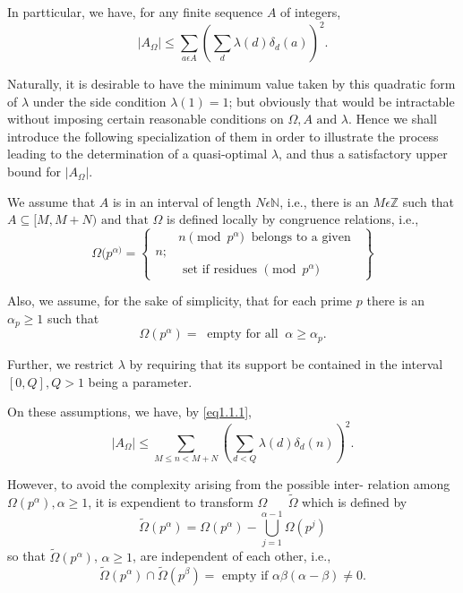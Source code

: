 In partticular, we have, for any finite sequence $A$ of integers,
\begin{equation*}
\mid A_{\Omega}\mid \leq \sum_{a \epsilon  A} \left(\sum_{d} \lambda(d)
\delta_{d} (a)\right)^{2}.\tag{1.1.1}\label{eq1.1.1} 
\end{equation*}

Naturally, it  is desirable to have the minimum value taken by this
quadratic form of $\lambda$ under the side condition $\lambda(1) = 1$;
but obviously that would be intractable without imposing certain
reasonable conditions on $\Omega, A \text{ and } \lambda$. Hence we
shall introduce the following specialization of them in order to
illustrate the process leading to the determination of a quasi-optimal
$\lambda$, and thus a satisfactory upper bound for $|A_{\Omega} |$. 

We assume that $A$ is in an interval of length $N \epsilon
\mathbb{N}$, i.e., there is an $M \epsilon \mathbb{Z}$  such that
$A \subseteq [M, M + N) \text{ and that } \Omega$ is defined locally
by congruence relations, i.e., 
\begin{equation*}
  \Omega(p^{\alpha)} =
  \left\{
  \begin{aligned}
    & n \pmod {p^\alpha} ~\text{ belongs to a given }~ \\
    n; & \\
    & \text{ set if residues } \pmod {p^\alpha} 
  \end{aligned}
  \right\}\tag{1.1.2}\label{eq1.1.2}
\end{equation*}\pageoriginale

Also, we assume, for the sake of simplicity, that for each prime $p$
there is an $\alpha_{p} \geq 1$ such that 
\begin{equation*}
\Omega(p^{\alpha}) = ~\text{ empty for all }~ \alpha \geq
\alpha_{p}.\tag{1.1.3}\label{eq1.1.3} 
\end{equation*}

Further, we restrict $\lambda$ by requiring that its support be
contained in the interval $[0, Q], Q > 1$ being a parameter. 

On these assumptions, we have, by \eqref{eq1.1.1}, 
\begin{equation*}
  | A_{\Omega} | \leq \sum_{M \leq n < M+N} \left(\sum_{d < Q} \lambda(d)
  \delta_{d} (n)\right)^{2}.\tag{1.1.4} \label{eq1.1.4}
\end{equation*}

However, to avoid the complexity arising from the possible inter-
relation among $\Omega(p^{\alpha}), \alpha \geq 1$, it is expendient
to transform $\Omega$ ~~ $\tilde{\Omega}$ which is defined by  
$$
\tilde{\Omega}(p^\alpha) = \Omega (p^\alpha) -
\bigcup^{\alpha-1}_{j=1} \Omega(p^j) 
$$
so that $\tilde{\Omega}(p^{\alpha})$, $\alpha \geq 1$, are independent
of each other, i.e., 
\begin{equation*}
\tilde{\Omega}(p^\alpha) \cap \tilde{\Omega}(p^\beta) = \text{ empty
  if } \alpha\beta (\alpha - \beta) \neq 0.\tag{1.1.5} \label{eq1.1.5}
\end{equation*}

